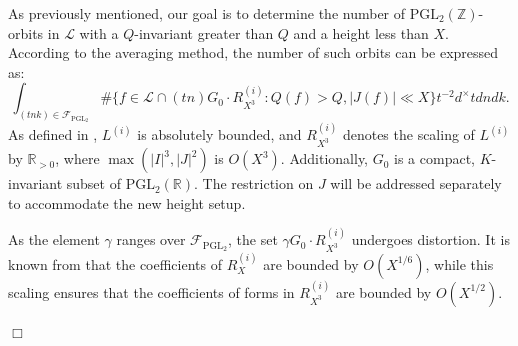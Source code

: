 \documentclass{article}
\newenvironment{customproof}[1][]
{\par\noindent{\textbf{Proof of #1:}}\quad}
{$\Box$ \vspace{2 ex}}
\begin{document}
\begin{customproof}[Theorem \ref{IJ-Sieve}]
As previously mentioned, our goal is to determine the number of $\text{PGL}_2(\mathbb{Z})$-orbits in $\mathcal{L}$ with a $Q$-invariant greater than $Q$ and a height less than $X$. According to the averaging method, the number of such orbits can be expressed as:
\begin{equation}\label{average-sieve}
\int_{(tnk)\in \mathcal{F}_{\text{PGL}_2}} \#\big\{f \in \mathcal{L} \cap (tn)G_0 \cdot R^{(i)}_{X^3} : Q(f) > Q,  |J(f)| \ll X \big\} t^{-2} d^{\times}t  dndk.
\end{equation}
As defined in \cite{2sel-e}, $L^{(i)}$ is absolutely bounded, and $R^{(i)}_{X^3}$ denotes the scaling of $L^{(i)}$ by $\mathbb{R}_{>0}$, where $\max(|I|^3, |J|^2)$ is $O(X^3)$. Additionally, $G_0$ is a compact, $K$-invariant subset of $\text{PGL}_2(\mathbb{R})$. The restriction on $J$ will be addressed separately to accommodate the new height setup.

As the element $\gamma$ ranges over $\mathcal{F}_{\text{PGL}_2}$, the set $\gamma G_0 \cdot R^{(i)}_{X^3}$ undergoes distortion. It is known from \cite{2sel-e} that the coefficients of $R_X^{(i)}$ are bounded by $O(X^{1/6})$, while this scaling ensures that the coefficients of forms in $R_{X^3}^{(i)}$ are bounded by $O(X^{1/2})$.


\end{customproof}
\end{document}
